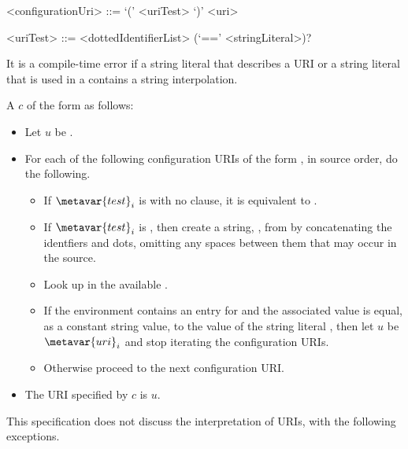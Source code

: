 \documentclass[makeidx]{article}
\begin{document}
{\begin{grammar}
<configurationUri> ::= \IF{} `(' <uriTest> `)' <uri>

<uriTest> ::= <dottedIdentifierList> (`==' <stringLiteral>)?
\end{grammar}

\LMHash{}%
It is a compile-time error if a string literal that describes a URI
or a string literal that is used in a 
contains a string interpolation.

\LMHash{}%
A  $c$ of the form
 as follows:
\begin{itemize}
\item{} Let $u$ be .
\item{} For each of the following configuration URIs of the form , in source order, do the following.
\begin{itemize}
  \item{} If $\metavar{test}_i$ is  with no \lit{==} clause, it is
  equivalent to .
  \item{} If $\metavar{test}_i$ is ,
  then create a string, , from 
  by concatenating the identfiers and dots,
  omitting any spaces between them that may occur in the source.
  \item{} Look up  in the available
  .
  \item{} If the environment contains an entry for  and the
  associated value is equal, as a constant string value, to the value of
  the string literal ,
  then let $u$ be $\metavar{uri}_i$ and stop iterating the configuration URIs.
  \item{} Otherwise proceed to the next configuration URI.
\end{itemize}
\item{} The URI specified by $c$ is $u$.
\end{itemize}

\LMHash{}%
This specification does not discuss the interpretation of URIs, with the following exceptions.

}
\end{document}
